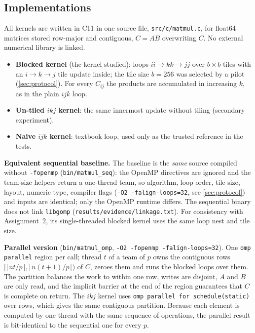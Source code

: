 \documentclass[conference,a4paper]{IEEEtran}
\begin{document}
\subsection{Implementations}
All kernels are written in C11 in one source file, \texttt{src/c/matmul.c}, for float64 matrices
stored row-major and contiguous, $C=AB$ overwriting $C$. No external numerical library is linked.
\begin{itemize}
\item \textbf{Blocked kernel} (the kernel studied): loops $ii\!\to\!kk\!\to\!jj$ over $b\times b$ tiles
  with an $i\!\to\!k\!\to\!j$ tile update inside; the tile size $b=256$ was selected by a pilot
  (\cref{sec:protocol}). For every $C_{ij}$ the products are accumulated in increasing $k$, as in the
  plain $ijk$ loop.
\item \textbf{Un-tiled $ikj$ kernel}: the same innermost update without tiling (secondary experiment).
\item \textbf{Naive $ijk$ kernel}: textbook loop, used only as the trusted reference in the tests.
\end{itemize}
\textbf{Equivalent sequential baseline.} The baseline is the \emph{same} source compiled without
\texttt{-fopenmp} (\texttt{bin/matmul\_seq}): the OpenMP directives are ignored and the team-size
helpers return a one-thread team, so algorithm, loop order, tile size, layout, numeric type, compiler
flags (\texttt{-O2 -falign-loops=32}, see \cref{sec:protocol}) and inputs are identical; only the
OpenMP runtime differs. The sequential binary
does not link \texttt{libgomp} (\texttt{results/evidence/linkage.txt}). For consistency with
Assignment~2, its single-threaded blocked kernel uses the same loop nest and tile size.

\textbf{Parallel version} (\texttt{bin/matmul\_omp}, \texttt{-O2 -fopenmp -falign-loops=32}). One
\texttt{omp parallel} region per call; thread $t$ of a team of $p$ owns the contiguous rows
$[\lfloor nt/p\rfloor,\lfloor n(t+1)/p\rfloor)$ of $C$, zeroes them and runs the blocked loops over
them. The partition balances the work to within one row, writes are disjoint, $A$ and $B$ are only
read, and the implicit barrier at the end of the region guarantees that $C$ is complete on return.
The $ikj$ kernel uses \texttt{omp parallel for schedule(static)} over rows, which gives the same
contiguous partition. Because each element is computed by one thread with the same sequence of
operations, the parallel result is bit-identical to the sequential one for every $p$.
\end{document}
